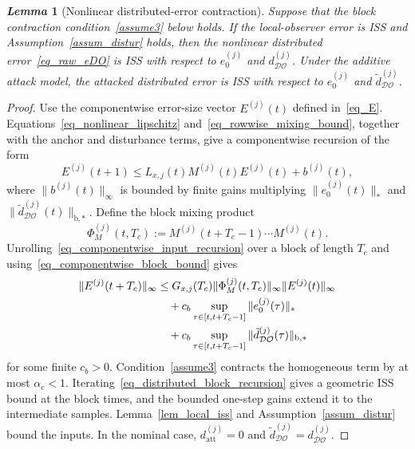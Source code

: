 \documentclass[letterpaper,journal]{IEEEtran}
\def\DO{\mathcal{DO}} %
\newtheorem{lemma}{\it Lemma}%
\begin{document}
\begin{lemma}[Nonlinear distributed-error contraction]\label{lem_dist_contraction}
Suppose that the block contraction condition~\eqref{assume3} below holds. If the local-observer error is ISS and Assumption~\ref{assum_distur} holds, then the nonlinear distributed error~\eqref{eq_raw_eDO} is ISS with respect to $e_0^{(j)}$ and $d_{\DO}^{(j)}$. Under the additive attack model, the attacked distributed error is ISS with respect to $e_0^{(j)}$ and $\tilde d_{\DO}^{(j)}$.
\end{lemma}
\begin{proof}
Use the componentwise error-size vector $E^{(j)}(t)$ defined in~\eqref{eq_E}. Equations~\eqref{eq_nonlinear_lipschitz} and~\eqref{eq_rowwise_mixing_bound}, together with the anchor and disturbance terms, give a componentwise recursion of the form
\begin{equation}
E^{(j)}(t+1)
\le L_{x,j}(t)M^{(j)}(t)E^{(j)}(t)+b^{(j)}(t),
\label{eq_componentwise_input_recursion}
\end{equation}
where $\|b^{(j)}(t)\|_\infty$ is bounded by finite gains multiplying $\|e_0^{(j)}(t)\|_*$ and $\|\tilde d_{\DO}^{(j)}(t)\|_{\mathrm{b},*}$. Define the block mixing product
\begin{equation}
\Phi_M^{(j)}(t,T_c)
:=M^{(j)}(t+T_c-1)\cdots M^{(j)}(t).
\label{eq_block_mixing_product}
\end{equation}
Unrolling~\eqref{eq_componentwise_input_recursion} over a block of length $T_c$ and using~\eqref{eq_componentwise_block_bound} gives
\begin{align}
\|E^{(j)}(t+T_c)\|_\infty
&\le G_{x,j}(T_c)
\|\Phi_M^{(j)}(t,T_c)\|_\infty
\|E^{(j)}(t)\|_\infty\notag\\
&\quad+c_b\sup_{\tau\in[t,t+T_c-1]}
\|e_0^{(j)}(\tau)\|_*\notag\\
&\quad+c_b\sup_{\tau\in[t,t+T_c-1]}
\|\tilde d_{\DO}^{(j)}(\tau)\|_{\mathrm{b},*}
\label{eq_distributed_block_recursion}
\end{align}
for some finite $c_b>0$. Condition~\eqref{assume3} contracts the homogeneous term by at most $\alpha_c<1$. Iterating~\eqref{eq_distributed_block_recursion} gives a geometric ISS bound at the block times, and the bounded one-step gains extend it to the intermediate samples. Lemma~\ref{lem_local_iss} and Assumption~\ref{assum_distur} bound the inputs. In the nominal case, $d_{\mathrm{att}}^{(j)}=0$ and $\tilde d_{\DO}^{(j)}=d_{\DO}^{(j)}$.
\end{proof}
\end{document}
